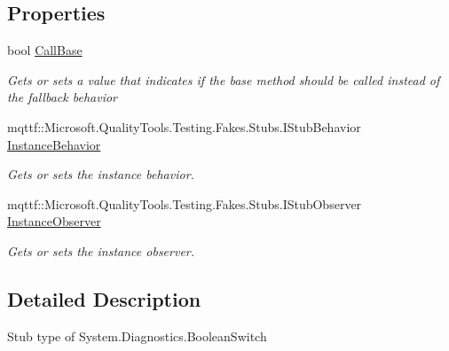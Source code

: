 \subsection*{Properties}
\begin{DoxyCompactItemize}
\item 
bool \hyperlink{class_system_1_1_diagnostics_1_1_fakes_1_1_stub_boolean_switch_a7879fafd8a5171e51cb18b8e943c118b}{Call\-Base}
\begin{DoxyCompactList}\small\item\em Gets or sets a value that indicates if the base method should be called instead of the fallback behavior\end{DoxyCompactList}\item 
mqttf\-::\-Microsoft.\-Quality\-Tools.\-Testing.\-Fakes.\-Stubs.\-I\-Stub\-Behavior \hyperlink{class_system_1_1_diagnostics_1_1_fakes_1_1_stub_boolean_switch_a5c4a2d238b5ef78f8dcf80a9bc6cf061}{Instance\-Behavior}
\begin{DoxyCompactList}\small\item\em Gets or sets the instance behavior.\end{DoxyCompactList}\item 
mqttf\-::\-Microsoft.\-Quality\-Tools.\-Testing.\-Fakes.\-Stubs.\-I\-Stub\-Observer \hyperlink{class_system_1_1_diagnostics_1_1_fakes_1_1_stub_boolean_switch_aa1d1ba45215686cac9a258cf4468af01}{Instance\-Observer}
\begin{DoxyCompactList}\small\item\em Gets or sets the instance observer.\end{DoxyCompactList}\end{DoxyCompactItemize}


\subsection{Detailed Description}
Stub type of System.\-Diagnostics.\-Boolean\-Switch



